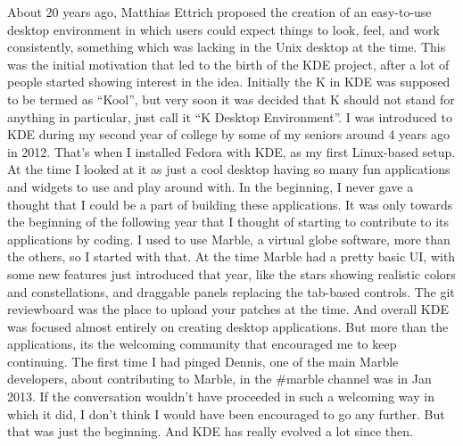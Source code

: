 

\noindent{}About 20 years ago, Matthias Ettrich proposed the creation of an easy-to-use desktop environment in which users could expect things to look, feel, and work consistently, something which was lacking in the Unix desktop at the time. This was the initial motivation that led to the birth of the KDE project, after a lot of people started showing interest in the idea. Initially the K in KDE was supposed to be termed as “Kool”, but very soon it was decided that K should not stand for anything in particular, just call it “K Desktop Environment”. I was introduced to KDE during my second year of college by some of my seniors around 4 years ago in 2012. That's when I installed Fedora with KDE, as my first Linux-based setup. At the time I looked at it as just a cool desktop having so many fun applications and widgets to use and play around with. In the beginning, I never gave a thought that I could be a part of building these applications. It was only towards the beginning of the following year that I thought of starting to contribute to its applications by coding. I used to use Marble, a virtual globe software, more than the others, so I started with that. At the time Marble had a pretty basic UI, with some new features just introduced that year, like the stars showing realistic colors and constellations, and draggable panels replacing the tab-based controls. The git reviewboard was the place to upload your patches at the time. And overall KDE was focused almost entirely on creating desktop applications. But more than the applications, its the welcoming community that encouraged me to keep continuing. The first time I had pinged Dennis, one of the main Marble developers, about contributing to Marble, in the \#marble channel was in Jan 2013. If the conversation wouldn't have proceeded in such a welcoming way in which it did, I don't think I would have been encouraged to go any further. But that was just the beginning. And KDE has really evolved a lot since then.

